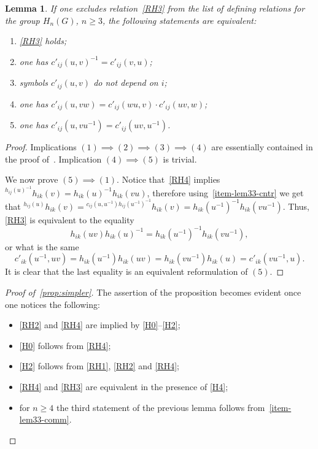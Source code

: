 \documentclass[oneside, 12pt]{amsart}
\theoremstyle{plain}
\numberwithin{equation}{section}
\newtheorem{lemma}{Lemma}
\numberwithin{lemma}{section}
\theoremstyle{remark}
\theoremstyle{definition}
\begin{document}
\begin{lemma}
If one excludes relation~\eqref{RH3} from the list of defining relations for the group $H_n(G)$, $n\geq 3$, the following statements are equivalent:
\begin{enumerate}
\item \label{item1} \eqref{RH3} holds;
\item \label{item4} one has $c'_{ij}(u, v)^{-1} = c'_{ij}(v, u)$;
\item \label{item5} symbols $c'_{ij}(u, v)$ do not depend on $i$;
\item \label{item5} one has $c'_{ij}(u, vw) = c'_{ij}(wu, v) \cdot c'_{ij}(uv, w)$;
\item \label{item6} one has $c'_{ij}(u, vu^{-1}) = c'_{ij}(uv, u^{-1})$.
\end{enumerate}
\end{lemma}
\begin{proof}
Implications $(1) \implies (2) \implies (3) \implies (4)$ are essentially contained in the proof of~\cite[Lemmas~2.1-2.2]{Reh78}.
Implication $(4) \implies (5)$ is trivial.

We now prove $(5) \implies (1)$. Notice that~\eqref{RH4} implies ${}^{h_{ij}(u)^{-1}}h_{ik}(v) = h_{ik}(u)^{-1} h_{ik}(vu)$, therefore
using~\cref{item-lem33-cntr} we get that ${}^{h_{ij}(u)}h_{ik}(v) = {}^{c_{ij}(u, u^{-1}) h_{ij}(u^{-1})^{-1}}h_{ik}(v) = h_{ik}(u^{-1})^{-1} h_{ik}(vu^{-1}).$
Thus, \eqref{RH3} is equivalent to the equality 
\[ h_{ik}(uv) h_{ik}(u)^{-1} = h_{ik}(u^{-1})^{-1} h_{ik}(vu^{-1}),\]
or what is the same
\[c'_{ik}(u^{-1}, uv) = h_{ik}(u^{-1}) h_{ik}(uv) =  h_{ik}(vu^{-1}) h_{ik}(u) = c'_{ik}(vu^{-1}, u).\]
It is clear that the last equality is an equivalent reformulation of $(5)$.
\end{proof}

\begin{proof}[Proof of~\cref{prop:simpler}]
The assertion of the proposition becomes evident once one notices the following:
\begin{itemize}
 \item \eqref{RH2} and \eqref{RH4} are implied by \eqref{H0}--\eqref{H2};
 \item \eqref{H0} follows from \eqref{RH4};
 \item \eqref{H2} follows from \eqref{RH1}, \eqref{RH2} and \eqref{RH4};
 \item \eqref{RH4} and \eqref{RH3} are equivalent in the presence of \eqref{H4};
 \item for $n\geq 4$ the third statement of the previous lemma follows from~\cref{item-lem33-comm}.
\end{itemize}
\end{proof}
\end{document}
